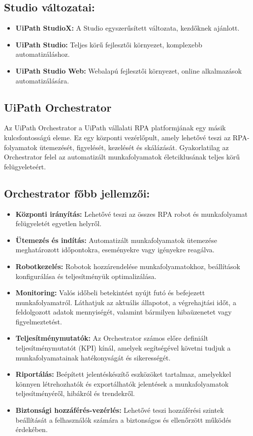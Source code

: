 \documentclass[
]{thesis-ekf}
\theoremstyle{definition}
\theoremstyle{remark}
\begin{document}
\subsection*{Studio változatai:}
	\begin{itemize}
		\item \textbf{UiPath StudioX:} A Studio egyszerűsített változata, kezdőknek ajánlott.
		\item \textbf{UiPath Studio:} Teljes körű fejlesztői környezet, komplexebb automatizáláshoz.
		\item \textbf{UiPath Studio Web:} Webalapú fejlesztői környezet, online alkalmazások automatizálására.
	\end{itemize}

	
\subsection{ UiPath Orchestrator}
Az UiPath Orchestrator a UiPath vállalati RPA platformjának egy másik kulcsfontosságú eleme. Ez egy központi vezérlőpult, amely lehetővé teszi az RPA-folyamatok ütemezését, figyelését, kezelését és skálázását. Gyakorlatilag az Orchestrator felel az automatizált munkafolyamatok életciklusának teljes körű felügyeleteért.

\subsection*{Orchestrator főbb jellemzői:}
\begin{itemize}
		\item \textbf{Központi irányítás:} Lehetővé teszi az összes RPA robot és munkafolyamat felügyeletét egyetlen helyről.
		\item \textbf{Ütemezés és indítás:} Automatizált munkafolyamatok ütemezése meghatározott időpontokra, eseményekre vagy igényekre reagálva.
		\item \textbf{Robotkezelés:} Robotok hozzárendelése munkafolyamatokhoz, beállítások konfigurálása és teljesítményük optimalizálása.
		\item \textbf{Monitoring:} Valós időbeli betekintést nyújt futó és befejezett munkafolyamatról. Láthatjuk az aktuális állapotot, a végrehajtási időt, a feldolgozott adatok mennyiségét, valamint bármilyen hibaüzenetet vagy figyelmeztetést.
		\item \textbf{Teljesítménymutatók:} Az Orchestrator számos előre definiált teljesítménymutatót (KPI) kínál, amelyek segítségével követni tudjuk a  munkafolyamatainak hatékonyságát és sikerességét.
		\item \textbf{Riportálás:} Beépített jelentéskészítő eszközöket tartalmaz, amelyekkel könnyen létrehozhatók és exportálhatók jelentések a munkafolyamatok teljesítményéről, hibákról és trendekről.
		\item \textbf{Biztonsági hozzáférés-vezérlés:} Lehetővé teszi hozzáférési szintek beállítását a felhasználók számára a biztonságos és ellenőrzött működés érdekében.
\end{itemize}
\end{document}
